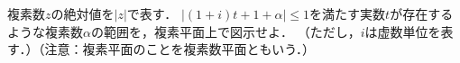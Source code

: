 複素数$z$の絶対値を$|z|$で表す．
$|(1+i)t+1+\alpha|\le 1$を満たす実数$t$が存在するような複素数$\alpha$の範囲を，複素平面上で図示せよ．
（ただし，$i$は虚数単位を表す．）（注意：複素平面のことを複素数平面ともいう．）
